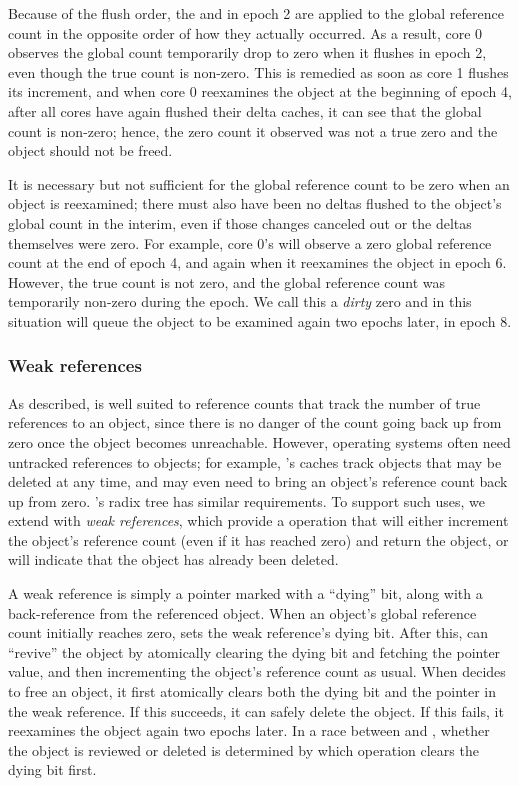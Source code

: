 Because of the flush order, the  and  in epoch 2
are applied to
the global reference count in the opposite order of how they actually
occurred.  As a result, core 0 observes the global count temporarily
drop to zero when it flushes in epoch 2, even though the true count is
non-zero.  This is remedied as soon as core 1 flushes its increment,
and when core 0 reexamines the object at the beginning of epoch 4,
after all cores have again flushed their delta caches, it can see
that the global count is non-zero; hence, the zero count it observed
was not a true zero and the object should not be freed.

It is necessary but not sufficient for the global reference count to
be zero when an object is reexamined; there must also have been no
deltas flushed to the object's global count in the interim, even if
those changes canceled out or the deltas themselves were zero.
%
For example, core 0's  will observe a zero global
reference count
at the end of epoch 4, and again when it reexamines the object in
epoch 6.  However, the true count is not zero, and the global
reference count was temporarily non-zero during the epoch.  We call
this a \emph{dirty} zero and in this situation  will
queue the object to be examined again two epochs later, in epoch 8.

\subsubsection{Weak references}
As described,  is well suited to reference counts that track
the number of true references to an object, since there is no danger
of the count going back up from zero once the object becomes unreachable.
However, operating systems often need untracked references to objects;
for example, \fs's caches track objects that may be deleted at any time,
and may even need to bring an object's reference count back up from
zero.  \vm's radix tree has similar requirements.  To support such
uses, we extend  with \emph{weak references}, which provide a
 operation that will either increment the object's
reference count (even if it has reached zero) and return the object,
or will indicate that the object has already been deleted.

A weak reference is simply a pointer marked with a ``dying'' bit,
along with a back-reference from the referenced object.  When an
object's global reference count initially reaches zero,  sets
the weak reference's dying bit.  After this,  can
``revive'' the object by atomically clearing the dying bit and
fetching the pointer value, and then incrementing the object's
reference count as usual.  When  decides to free an object,
it first atomically clears both the dying bit and the pointer in the
weak reference.  If this succeeds, it can safely delete the object.
If this fails, it reexamines the object again two epochs later.  In a
race between  and , whether the object is
reviewed or deleted is determined by which operation clears the dying
bit first.

